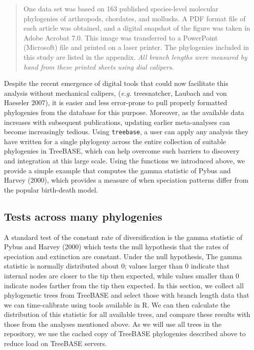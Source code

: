 \documentclass[author-year, 8pt, 3p]{elsarticle} %
\begin{document}
\begin{quote}
One data set was based on 163 published species-level molecular
phylogenies of arthropods, chordates, and mollusks. A PDF format file of
each article was obtained, and a digital snapshot of the figure was
taken in Adobe Acrobat 7.0. This image was transferred to a PowerPoint
(Microsoft) file and printed on a laser printer. The phylogenies
included in this study are listed in the appendix. \emph{All branch
lengths were measured by hand from these printed sheets using dial
calipers.}

\end{quote}
Despite the recent emergence of digital tools that could now facilitate
this analysis without mechanical calipers, (\emph{e.g.} treesnatcher,
Laubach and von Haeseler 2007), it is easier and less error-prone to
pull properly formatted phylogenies from the database for this purpose.
Moreover, as the available data increases with subsequent publications,
updating earlier meta-analyses can become increasingly tedious. Using
\texttt{treebase}, a user can apply any analysis they have written for a
single phylogeny across the entire collection of suitable phylogenies in
TreeBASE, which can help overcome such barriers to discovery and
integration at this large scale. Using the functions we introduced
above, we provide a simple example that computes the gamma statistic of
Pybus and Harvey (2000), which provides a measure of when speciation
patterns differ from the popular birth-death model.

\subsection{Tests across many phylogenies}

A standard test of the constant rate of diversification is the gamma
statistic of Pybus and Harvey (2000) which tests the null hypothesis
that the rates of speciation and extinction are constant. Under the null
hypothesis, The gamma statistic is normally distributed about 0; values
larger than 0 indicate that internal nodes are closer to the tip then
expected, while values smaller than 0 indicate nodes farther from the
tip then expected. In this section, we collect all phylogenetic trees
from TreeBASE and select those with branch length data that we can
time-calibrate using tools available in R. We can then calculate the
distribution of this statistic for all available trees, and compare
these results with those from the analyses mentioned above. As we will
use all trees in the repository, we use the cached copy of TreeBASE
phylogenies described above to reduce load on TreeBASE servers.
\end{document}
